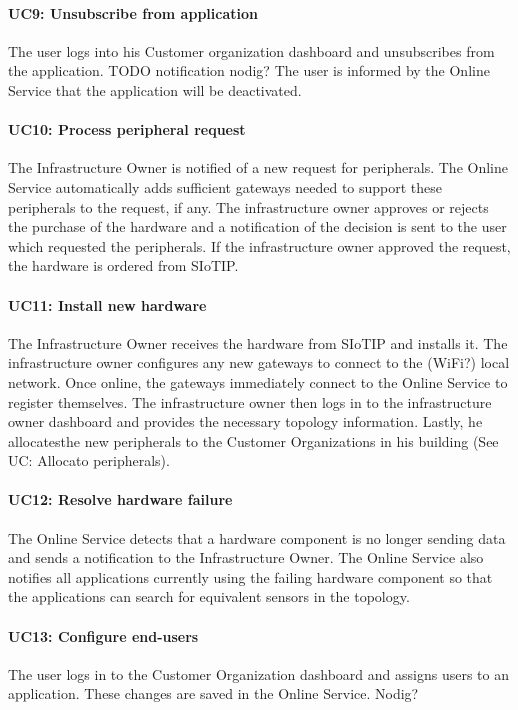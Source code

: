 \documentclass[english,peerreview]{sareport}
\begin{document}
\paragraph{UC9: Unsubscribe from application}
The user logs into his Customer organization dashboard and unsubscribes from the application. TODO notification nodig? The user is informed by the Online Service that the application will be deactivated.

\paragraph{UC10: Process peripheral request}
The Infrastructure Owner is notified of a new request for peripherals. The Online Service automatically adds sufficient gateways needed to support these peripherals to the request, if any. The infrastructure owner approves or rejects the purchase of the hardware and a notification of the decision is sent to the user which requested the peripherals. If the infrastructure owner approved the request, the hardware is ordered from SIoTIP.

\paragraph{UC11: Install new hardware}
The Infrastructure Owner receives the hardware from SIoTIP and installs it. The infrastructure owner configures any new gateways to connect to the (WiFi?) local network. Once online, the gateways immediately connect to the Online Service to register themselves. The infrastructure owner then logs in to the infrastructure owner dashboard and provides the necessary topology information. Lastly, he allocatesthe new peripherals to the Customer Organizations in his building (See UC: Allocato peripherals).

\paragraph{UC12: Resolve hardware failure}
The Online Service detects that a hardware component is no longer sending data and sends a notification to the Infrastructure Owner. The Online Service also notifies all applications currently using the failing hardware component so that the applications can search for equivalent sensors in the topology. 

\paragraph{UC13: Configure end-users}
The user logs in to the Customer Organization dashboard and assigns users to an application. These changes are saved in the Online Service.
Nodig?
\end{document}

